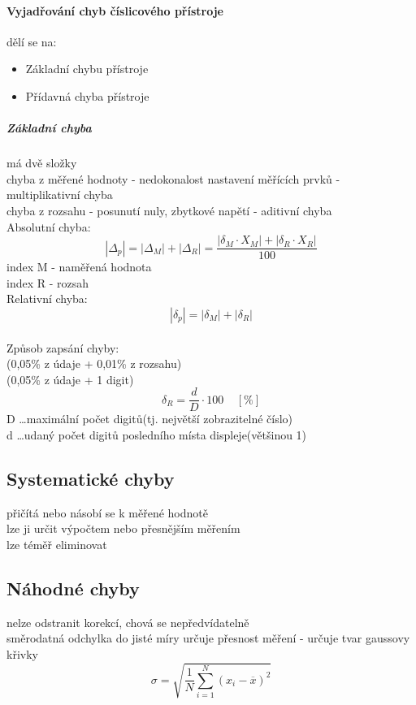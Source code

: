 \paragraph*{Vyjadřování chyb číslicového přístroje}
dělí se na:
\begin{itemize}
    \item Základní chybu přístroje
    \item Přídavná chyba přístroje
\end{itemize}
\subparagraph*{Základní chyba}
má dvě složky \\
chyba z měřené hodnoty - nedokonalost nastavení měřících prvků - multiplikativní chyba\\
chyba z rozsahu - posunutí nuly, zbytkové napětí - aditivní chyba\\
Absolutní chyba:
\begin{equation}
    |\Delta_p| = |\Delta_M| + |\Delta_R| = \frac{|\delta_M \cdot X_M|+|\delta_R \cdot X_R|}{100}
\end{equation}
index M - naměřená hodnota \\
index R - rozsah \\
Relativní chyba:
\begin{equation}
    |\delta_p| = |\delta_M| + |\delta_R|
\end{equation}
\\
Způsob zapsání chyby:\\
\textpm(0,05\% z údaje + 0,01\% z rozsahu)\\
\textpm(0,05\% z údaje + 1 digit)
\begin{equation}
    \delta_R = \frac{d}{D}\cdot 100 \;\;\;\;[\%]
\end{equation}
D \dots maximální počet digitů(tj. největší zobrazitelné číslo) \\
d \dots udaný počet digitů posledního místa displeje(většinou 1)\\
\subsection*{Systematické chyby}
přičítá nebo násobí se k měřené hodnotě\\
lze ji určit výpočtem nebo přesnějším měřením\\
lze téměř eliminovat\\

\subsection*{Náhodné chyby}
nelze odstranit korekcí, chová se nepředvídatelně\\
směrodatná odchylka do jisté míry určuje přesnost měření - určuje tvar gaussovy křivky
\begin{equation}
    \sigma = \sqrt{\frac{1}{N}\sum^N_{i=1}(x_i-\overline{x})^2}
\end{equation}
\newpage
